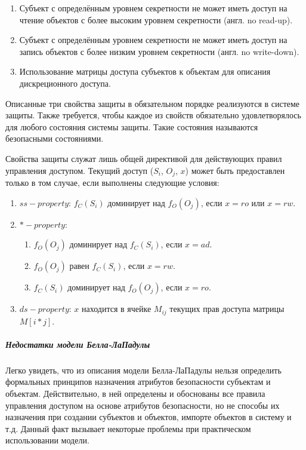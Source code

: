 \begin{enumerate}
    \item Субъект с определённым уровнем секретности не может иметь доступ на чтение объектов с более высоким уровнем секретности (англ. no read-up).
    \item Субъект с определённым уровнем секретности не может иметь доступ на запись объектов с более низким уровнем секретности (англ. no write-down).
    \item Использование матрицы доступа субъектов к объектам для описания дискреционного доступа.
\end{enumerate}

Описанные три свойства защиты в обязательном порядке реализуются в системе защиты. Также требуется, чтобы каждое из свойств обязательно удовлетворялось для любого состояния системы защиты. Такие состояния называются безопасными состояниями.

Свойства защиты служат лишь общей директивой для действующих правил управления доступом. Текущий доступ ($S_i$, $O_j$, $x$) может быть предоставлен только в том случае, если выполнены следующие условия:

\begin{enumerate}
	\item $ss-property$: $f_C(S_i)$ доминирует над $f_O(O_j)$, если $x = ro$ или $x = rw$.
	\item $*-property$:
	\begin{enumerate}
		\item $f_O (O_j)$ доминирует над $f_C(S_i)$, если $x = ad$.
		\item $f_O(O_j)$ равен $f_C(S_i)$, если $x = rw$.
		\item $f_C(S_i)$ доминирует над $f_O(O_j)$, если $x = ro$.
	\end{enumerate}
	\item $ds-property$: $x$ находится в ячейке $M_{ij}$ текущих прав доступа матрицы $M[i*j]$.
\end{enumerate}

\subparagraph{Недостатки модели Белла-ЛаПадулы}

Легко увидеть, что из описания модели Белла-ЛаПадулы нельзя определить формальных принципов назначения атрибутов безопасности субъектам и объектам. Действительно, в ней определены и обоснованы все правила управления доступом на основе атрибутов безопасности, но не способы их назначения при создании субъектов и объектов, импорте объектов в систему и т.д. Данный факт вызывает некоторые проблемы при практическом использовании модели.

